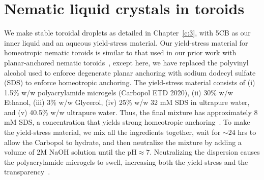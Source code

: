 \section{Nematic liquid crystals in toroids}
We make stable toroidal droplets as detailed in Chapter~\ref{c:3}, with 5CB as our inner liquid and an aqueous yield-stress material.
Our yield-stress material for homeotropic nematic toroids is similar to that used in our prior work with planar-anchored nematic toroids~\cite{RN24}, except here, we have replaced the polyvinyl alcohol used to enforce degenerate planar anchoring with sodium dodecyl sulfate (SDS) to enforce homeotropic anchoring.
The yield-stress material consists of (i) 1.5\% w/w polyacrylamide microgels (Carbopol ETD 2020), (ii) 30\% w/w Ethanol, (iii) 3\% w/w Glycerol, (iv) 25\% w/w 32 mM SDS in ultrapure water, and (v) 40.5\% w/w ultrapure water.
Thus, the final mixture has approximately 8 mM SDS, a concentration that yields strong homeotropic anchoring~\cite{RN235}.
To make the yield-stress material, we mix all the ingredients together, wait for $\sim 24$ hrs to allow the Carbopol to hydrate, and then neutralize the mixture by adding a volume of 2M NaOH solution until the pH$\approx 7$.
Neutralizing the dispersion causes the polyacrylamide microgels to swell, increasing both the yield-stress and the transparency~\cite{RN24,RN47}.

